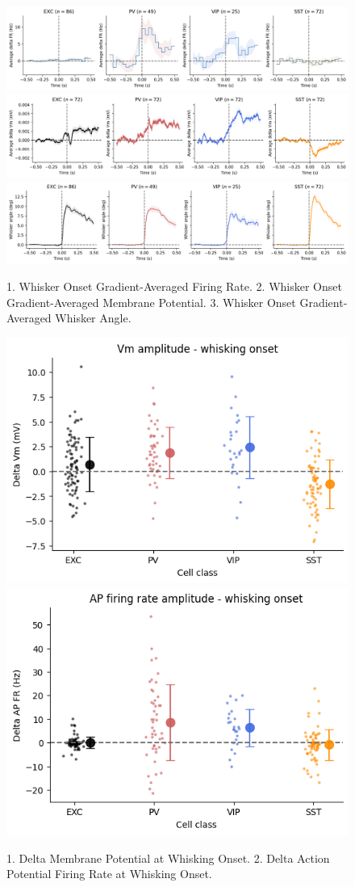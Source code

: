 \documentclass{IEEEtran}
\begin{document}
\begin{figure}[h!]
  \centering
  \includegraphics[width=0.9\columnwidth]{figures/given/9_WhiskOnset_GRD_AVG_FirinRate.png}
  \includegraphics[width=0.9\columnwidth]{figures/given/9_WhiskOnset_GRD_AVG_Vm.png}
  \includegraphics[width=0.9\columnwidth]{figures/given/9_WhiskOnset_GRD_AVG_WhiskerAngle.png}
  \caption{1. Whisker Onset Gradient-Averaged Firing Rate. 2. Whisker Onset Gradient-Averaged Membrane Potential. 3. Whisker Onset Gradient-Averaged Whisker Angle.}%
  \label{fig:9}
\end{figure}

\begin{figure}[h!]
  \centering
  \includegraphics[width=0.45\columnwidth]{figures/given/10_delta_vm_whisking_onset.png}
  \includegraphics[width=0.45\columnwidth]{figures/given/11_delta_ap_fr_whisking_onset.png}
  \caption{1. Delta Membrane Potential at Whisking Onset. 2. Delta Action Potential Firing Rate at Whisking Onset.}%
  \label{fig:10_11}
\end{figure}
\end{document}
